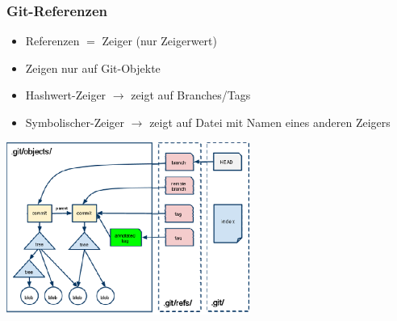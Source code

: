 \subsubsection{Git-Referenzen}
\begin{minipage}{10cm}
	\begin{itemize}
		\item Referenzen $=$ Zeiger (nur Zeigerwert)
		\item Zeigen nur auf Git-Objekte
		\item Hashwert-Zeiger $\rightarrow$ zeigt auf Branches/Tags
		\item Symbolischer-Zeiger $\rightarrow$ zeigt auf Datei mit Namen eines anderen Zeigers
	\end{itemize}
\end{minipage}
\begin{minipage}{8cm}
	\includegraphics[width=8cm]{images/git-referenz.png}
\end{minipage}
